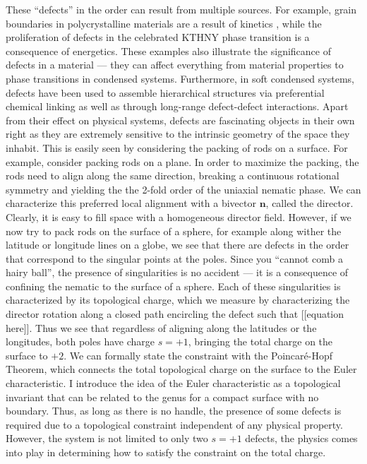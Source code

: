 These ``defects'' in the order can result from multiple sources.
For example, grain boundaries in polycrystalline materials are a result of kinetics , while the proliferation of defects in the celebrated KTHNY phase transition is a consequence of energetics.
These examples also illustrate the significance of defects in a material --- they can affect everything from material properties to phase transitions in condensed systems.
Furthermore, in soft condensed systems, defects have been used to assemble hierarchical structures via preferential chemical linking as well as through long-range defect-defect interactions.
Apart from their effect on physical systems, defects are fascinating objects in their own right as they are extremely sensitive to the intrinsic geometry of the space they inhabit.
This is easily seen by considering the packing of rods on a surface.
For example, consider packing rods on a plane.
In order to maximize the packing, the rods need to align along the same direction, breaking a continuous rotational symmetry and yielding the the 2-fold order of the uniaxial nematic phase.
We can characterize this preferred local alignment with a bivector $\mathbf{n}$, called the director.
Clearly, it is easy to fill space with a homogeneous director field.
However, if we now try to pack rods on the surface of a sphere, for example along wither the latitude or longitude lines on a globe, we see that there are defects in the order that correspond to the singular points at the poles.
Since you ``cannot comb a hairy ball'', the presence of singularities is no accident --- it is a consequence of confining the nematic to the surface of a sphere.
Each of these singularities is characterized by its topological charge, which we measure by characterizing the director rotation along a closed path encircling the defect such that [[equation here]].
Thus we see that regardless of aligning along the latitudes or the longitudes, both poles have charge $s = +1$, bringing the total charge on the surface to $+2$.
We can formally state the constraint with the Poincar\'e-Hopf Theorem, which connects the total topological charge on the surface to the Euler characteristic.
I introduce the idea of the Euler characteristic as a topological invariant that can be related to the genus for a compact surface with no boundary.
Thus, as long as there is no handle, the presence of some defects is required due to a topological constraint independent of any physical property.
However, the system is not limited to only two $s=+1$ defects, the physics comes into play in determining how to satisfy the constraint on the total charge.
